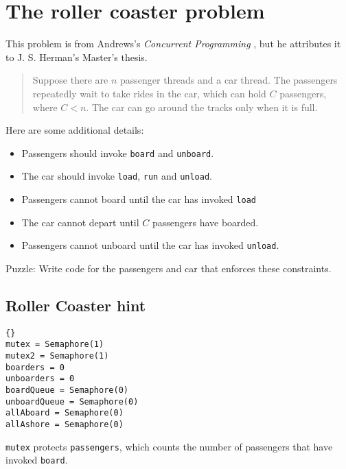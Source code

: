 \documentclass{book}
\newcommand{\clearemptydoublepage}{\newpage\cleardoublepage}
\begin{document}
\clearemptydoublepage
\section{The roller coaster problem}

This problem is from Andrews's {\em Concurrent
Programming} \cite{andrews}, but he attributes it to J. S. Herman's
Master's thesis.

\begin {quotation}
Suppose there are $n$ passenger threads and a car thread.  The passengers
repeatedly wait to take rides in the car, which can hold $C$ passengers,
where $C<n$.  The car can go around the tracks only when it is full.
\end{quotation}

Here are some additional details:

\begin{itemize}

\item Passengers should invoke {\tt board} and {\tt unboard}.

\item The car should invoke {\tt load}, {\tt run} and {\tt unload}.

\item Passengers cannot board until the car has invoked {\tt load}

\item The car cannot depart until $C$ passengers have boarded.

\item Passengers cannot unboard until the car
has invoked {\tt unload}.

\end{itemize}

Puzzle: Write code for the passengers and car that enforces these
constraints.


\clearemptydoublepage
\subsection{Roller Coaster hint}

\begin{lstlisting}[title={Roller Coaster hint}]{}
mutex = Semaphore(1)
mutex2 = Semaphore(1)
boarders = 0
unboarders = 0
boardQueue = Semaphore(0)
unboardQueue = Semaphore(0)
allAboard = Semaphore(0)
allAshore = Semaphore(0)
\end{lstlisting}

{\tt mutex} protects {\tt passengers}, which counts the number of
passengers that have invoked {\tt board}.  
\end{document}
